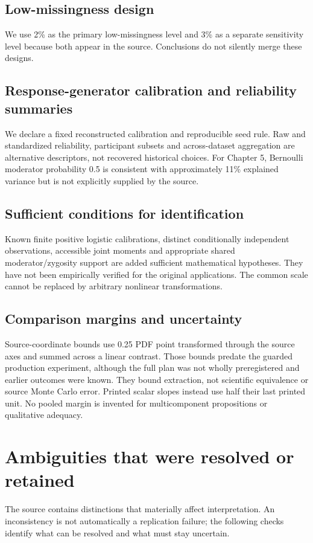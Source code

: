 \documentclass[11pt]{article}
\begin{document}
\subsection{Low-missingness design}
We use 2\% as the primary low-missingness level and 3\% as a separate sensitivity level because both appear in the source. Conclusions do not silently merge these designs.
\subsection{Response-generator calibration and reliability summaries}
We declare a fixed reconstructed calibration and reproducible seed rule. Raw and standardized reliability, participant subsets and across-dataset aggregation are alternative descriptors, not recovered historical choices. For Chapter 5, Bernoulli moderator probability 0.5 is consistent with approximately 11\% explained variance but is not explicitly supplied by the source.
\subsection{Sufficient conditions for identification}
Known finite positive logistic calibrations, distinct conditionally independent observations, accessible joint moments and appropriate shared moderator/zygosity support are added sufficient mathematical hypotheses. They have not been empirically verified for the original applications. The common scale cannot be replaced by arbitrary nonlinear transformations.
\subsection{Comparison margins and uncertainty}
Source-coordinate bounds use 0.25 PDF point transformed through the source axes and summed across a linear contrast. Those bounds predate the guarded production experiment, although the full plan was not wholly preregistered and earlier outcomes were known. They bound extraction, not scientific equivalence or source Monte Carlo error. Printed scalar slopes instead use half their last printed unit. No pooled margin is invented for multicomponent propositions or qualitative adequacy.

\section{Ambiguities that were resolved or retained}\label{sec:ambiguities}
The source contains distinctions that materially affect interpretation. An inconsistency is not automatically a replication failure; the following checks identify what can be resolved and what must stay uncertain.
\end{document}
